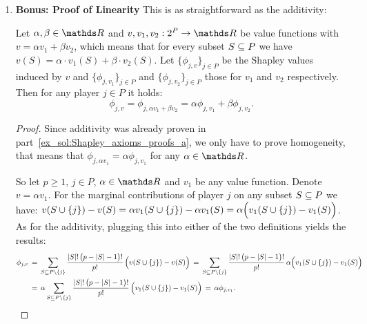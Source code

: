 {\begin{enumerate}
    
    
    \item \textbf{Bonus: Proof of Linearity}
    This is as straightforward as the additivity:

    \begin{theorem}[Linearity]
    Let $\alpha, \beta \in \R$ and $v, v_1, v_2 : 2^P \to \R$ be value functions with $v = \alpha v_1 + \beta v_2$, which means that for every subset $S \subseteq P$ we have $v(S) = \alpha \cdot v_1(S) + \beta \cdot v_2(S)$.
    Let $\{\phi_{j, v}\}_{j \in P}$ be the Shapley values induced by $v$ and $\{\phi_{j, v_1}\}_{j \in P}$ and $\{\phi_{j, v_2}\}_{j \in P}$ those for $v_1$ and $v_2$ respectively.
    Then for any player $j \in P$ it holds:
    $$
    \phi_{j, v} = \phi_{j, \alpha v_1 + \beta v_2} = \alpha \phi_{j, v_1} + \beta \phi_{j, v_2}.
    $$
    \end{theorem}

    \begin{proof}

        Since additivity was already proven in part~\ref{ex_sol:Shapley_axioms_proofs_a}, we only have to prove homogeneity, that means that $\phi_{j, \alpha v_1} = \alpha \phi_{j, v_1}$ for any $\alpha \in \R$.

        So let $p \geq 1$, $ j \in P$, $\alpha \in \R$ and $v_1$ be any value function.
        Denote $v = \alpha v_1$.        
        For the marginal contributions of player $j$ on any subset $S \subseteq P$ we have: $v(S \cup \{j\}) - v(S) = \alpha v_1(S \cup \{j\}) - \alpha v_1(S) = \alpha \Bigl( v_1(S \cup \{j\}) - v_1(S) \Bigr)$.
        As for the additivity, plugging this into either of the two definitions yields the results:
        \begin{align*}
            \phi_{j, v}
            & \,=\, \sum_{S \subseteq P \setminus \{j\}} \frac{|S|!\,\bigl(p - |S| - 1\bigr)!}{p!} \, \Bigl( v(S \cup \{j\}) - v(S) \Bigr) 
            \,=\, \sum_{S \subseteq P \setminus \{j\}} \frac{|S|!\,\bigl(p - |S| - 1\bigr)!}{p!} \, \alpha \Bigl( v_1(S \cup \{j\}) - v_1(S) \Bigr) \\
            & \,=\, \alpha \sum_{S \subseteq P \setminus \{j\}} \frac{|S|!\,\bigl(p - |S| - 1\bigr)!}{p!} \, \Bigl( v_1(S \cup \{j\}) - v_1(S) \Bigr) 
            \,=\, \alpha \phi_{j, v_1}.
        \end{align*}
        
    \end{proof}

\end{enumerate}

}
